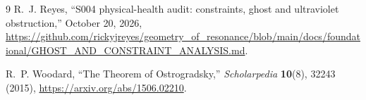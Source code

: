 \documentclass[11pt]{article}
\begin{document}
\begin{thebibliography}{9}
R.~J. Reyes, ``S004 physical-health audit: constraints, ghost and
ultraviolet obstruction,'' October 20, 2026,
\url{https://github.com/rickyjreyes/geometry_of_resonance/blob/main/docs/foundational/GHOST_AND_CONSTRAINT_ANALYSIS.md}.

R.~P. Woodard, ``The Theorem of Ostrogradsky,''
\emph{Scholarpedia} \textbf{10}(8), 32243 (2015),
\url{https://arxiv.org/abs/1506.02210}.
\end{thebibliography}
\end{document}
